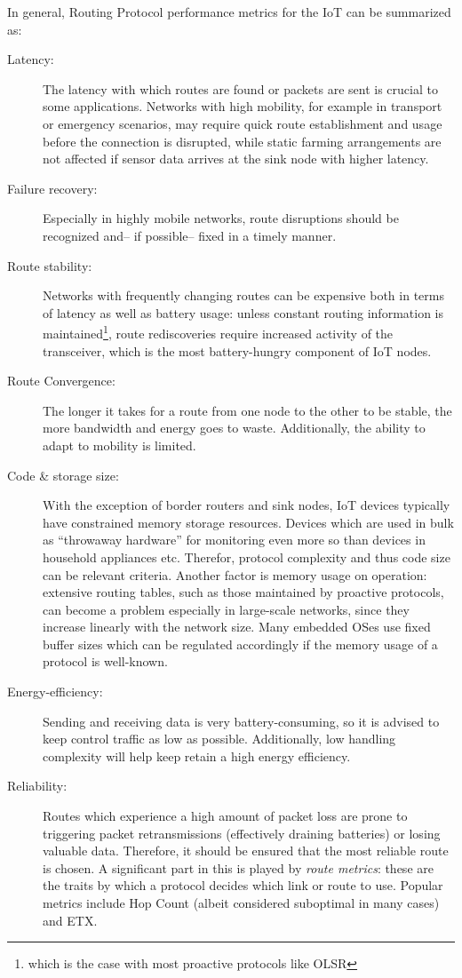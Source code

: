 \documentclass{acm_proc_article-sp}
\begin{document}
In general, Routing Protocol performance metrics for the IoT can be summarized as:
\begin{description}
\item[Latency:] The latency with which routes are found or packets are sent is crucial to some applications. Networks with high mobility, for example in transport or emergency scenarios, may require quick route establishment and usage before the connection is disrupted, while static farming arrangements are not affected if sensor data arrives at the sink node with higher latency.
\item[Failure recovery:] Especially in highly mobile networks, route disruptions should be recognized and-- if possible-- fixed in a timely manner.
\item[Route stability:] Networks with frequently changing routes can be expensive both in terms of latency as well as battery usage: unless constant routing information is maintained\footnote{ which is the case with most proactive protocols like OLSR\cite{RFC-3626}}, route rediscoveries require increased activity of the transceiver, which is the most battery-hungry component of IoT nodes.
\item[Route Convergence:] The longer it takes for a route from one node to the other to be stable, the more bandwidth and energy goes to waste. Additionally, the ability to adapt to mobility is limited. %
\item[Code \& storage size:] With the exception of border routers and sink nodes, IoT devices typically have constrained memory storage resources. Devices which are used in bulk as ``throwaway hardware'' for monitoring even more so than devices in household appliances etc. Therefor, protocol complexity and thus code size can be relevant criteria. Another factor is memory usage on operation: extensive routing tables, such as those maintained by proactive protocols, can become a problem especially in large-scale networks, since they increase linearly with the network size. Many embedded OSes use fixed buffer sizes which can be regulated accordingly if the memory usage of a protocol is well-known.
\item[Energy-efficiency:] Sending and receiving data is very battery-consuming, so it is advised to keep control traffic as low as possible. Additionally, low handling complexity will help keep retain a high energy efficiency.
\item[Reliability:] Routes which experience a high amount of packet loss are prone to triggering packet retransmissions (effectively draining batteries) or losing valuable data. Therefore, it should be ensured that the most reliable route is chosen. A significant part in this is played by \emph{route metrics}: these are the traits by which a protocol decides which link or route to use. Popular metrics include Hop Count (albeit considered suboptimal in many cases) and \gls{ETX}.
\end{description}
\end{document}
